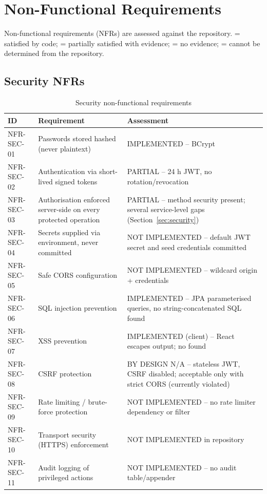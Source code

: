 \section{Non-Functional Requirements}
\label{sec:non-functional-requirements}

Non-functional requirements (NFRs) are assessed against the repository.  = satisfied by code;  = partially satisfied with evidence;  = no evidence;  = cannot be determined from the repository.

\subsection{Security NFRs}
\begin{table}[H]
\centering
\caption{Security non-functional requirements}
\label{tab:nfr-security}
\begin{tabular}{@{}C{1.4cm}L{8.8cm}L{3.8cm}@{}}
\toprule
\textbf{ID} & \textbf{Requirement} & \textbf{Assessment} \\
\midrule
NFR-SEC-01 & Passwords stored hashed (never plaintext) & IMPLEMENTED -- BCrypt \\
NFR-SEC-02 & Authentication via short-lived signed tokens & PARTIAL -- 24 h JWT, no rotation/revocation \\
NFR-SEC-03 & Authorisation enforced server-side on every protected operation & PARTIAL -- method security present; several service-level gaps (Section~\ref{sec:security}) \\
NFR-SEC-04 & Secrets supplied via environment, never committed & NOT IMPLEMENTED -- default JWT secret and seed credentials committed \\
NFR-SEC-05 & Safe CORS configuration & NOT IMPLEMENTED -- wildcard origin + credentials \\
NFR-SEC-06 & SQL injection prevention & IMPLEMENTED -- JPA parameterised queries, no string-concatenated SQL found \\
NFR-SEC-07 & XSS prevention & IMPLEMENTED (client) -- React escapes output; no  found \\
NFR-SEC-08 & CSRF protection & BY DESIGN N/A -- stateless JWT, CSRF disabled; acceptable only with strict CORS (currently violated) \\
NFR-SEC-09 & Rate limiting / brute-force protection & NOT IMPLEMENTED -- no rate limiter dependency or filter \\
NFR-SEC-10 & Transport security (HTTPS) enforcement & NOT IMPLEMENTED in repository \\
NFR-SEC-11 & Audit logging of privileged actions & NOT IMPLEMENTED -- no audit table/appender \\
\bottomrule
\end{tabular}
\end{table}

